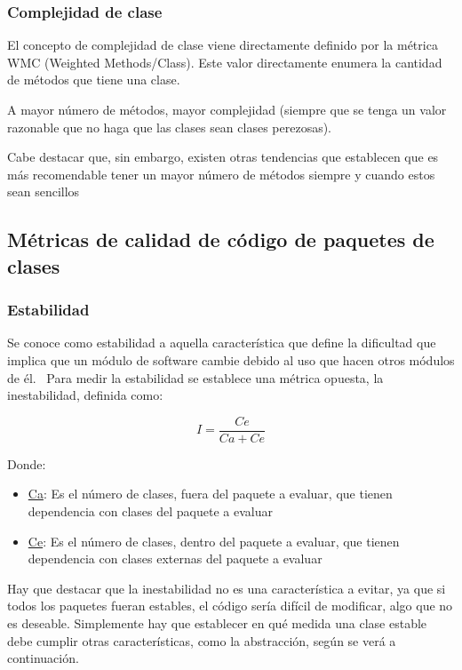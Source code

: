 \documentclass[11pt]{article}
\begin{document}
\subsubsection{Complejidad de clase}

El concepto de complejidad de clase viene directamente definido por la métrica WMC (Weighted Methods/Class). Este valor directamente enumera la cantidad de métodos que tiene una clase. 

A mayor número de métodos, mayor complejidad (siempre que se tenga un valor razonable que no haga que las clases sean clases perezosas).

Cabe destacar que, sin embargo, existen otras tendencias que establecen que es más recomendable tener un mayor número de métodos siempre y cuando estos sean sencillos~\cite{refactoring:improvingdesign}

\subsection{Métricas de calidad de código de paquetes de clases}

\subsubsection{Estabilidad}
Se conoce como estabilidad a aquella característica que define la dificultad que implica que un módulo de software cambie debido al uso que hacen otros módulos de él.~\cite{unclebob:stabilityandabstraction}
Para medir la estabilidad se establece una métrica opuesta, la inestabilidad, definida como:

\begin{equation}
I = \frac{Ce}{Ca + Ce}
\end{equation}

Donde:
\begin{itemize}
\item{\underline{Ca}}: Es el número de clases, fuera del paquete a evaluar, que tienen dependencia con clases del paquete a evaluar
\item{\underline{Ce}}: Es el número de clases, dentro del paquete a evaluar, que tienen dependencia con clases externas del paquete a evaluar
\end{itemize}

Hay que destacar que la inestabilidad no es una característica a evitar, ya que si todos los paquetes fueran estables, el código sería difícil de modificar, algo que no es deseable. Simplemente hay que establecer en qué medida una clase estable debe cumplir otras características, como la abstracción, según se verá a continuación.
\end{document}
